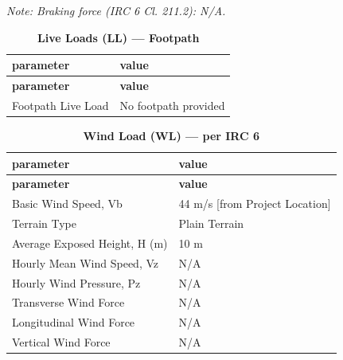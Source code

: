 \documentclass[12pt,a4paper]{report}
\numberwithin{table}{chapter}
\numberwithin{figure}{chapter}
\begin{document}
\noindent\textit{Note: Braking force (IRC 6 Cl. 211.2): N/A.}

\vspace{1em}
\begin{longtable}{|L{5.5cm}|p{10.0cm}|}
\caption{\textbf{Live Loads (LL) --- Footpath}}\\
\hline
\textbf{parameter} & \textbf{value} \\[6pt]
\hline
\endfirsthead

\hline
\textbf{parameter} & \textbf{value} \\[6pt]
\hline
\endhead

\textnormal{Footpath Live Load} & No footpath provided \\[6pt]
\hline
\end{longtable}


\vspace{1em}
\begin{longtable}{|L{5.5cm}|p{10.0cm}|}
\caption{\textbf{Wind Load (WL) --- per IRC 6}}\\
\hline
\textbf{parameter} & \textbf{value} \\
\hline
\endfirsthead

\hline
\textbf{parameter} & \textbf{value} \\
\hline
\endhead
\hline
\endlastfoot
\textnormal{Basic Wind Speed, Vb} & 44 m/s [from Project Location] \\[6pt]
\hline
\textnormal{Terrain Type} & Plain Terrain \\[6pt]
\hline
\textnormal{Average Exposed Height, H (m)} & 10 m \\[6pt]
\hline
\textnormal{Hourly Mean Wind Speed, Vz} & N/A \\[6pt]
\hline
\textnormal{Hourly Wind Pressure, Pz} & N/A \\[6pt]
\hline
\textnormal{Transverse Wind Force} & N/A \\[6pt]
\hline
\textnormal{Longitudinal Wind Force} & N/A \\[6pt]
\hline
\textnormal{Vertical Wind Force} & N/A \\[6pt]
\end{longtable}
\end{document}
